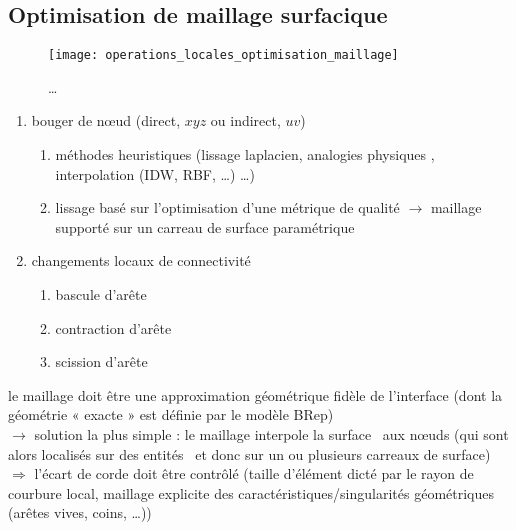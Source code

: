






\subsection{Optimisation de maillage surfacique}
\begin{figure}
\centering
\texttt{[image: operations\_locales\_optimisation\_maillage]}
\caption{\ldots}
\label{fig:operations_locales_optimisation_maillage}
\end{figure}

\begin{enumerate}
	\item bouger de n\oe ud (direct, \ie $xyz$ ou indirect, \ie $uv$)
	\begin{enumerate}
		\item méthodes heuristiques (lissage laplacien, analogies physiques \cite{farhat1998}, interpolation (IDW, RBF, \ldots) \ldots)
		\item lissage basé sur l'optimisation d'une métrique de qualité \cite{freitag1995, canann1998, jiao2008} \cite{gargallo2014} $\to$ maillage supporté sur un carreau de surface paramétrique
	\end{enumerate}
	\item changements locaux de connectivité
	\begin{enumerate}
		\item bascule d'arête
		\item contraction d'arête
		\item scission d'arête
	\end{enumerate}
\end{enumerate}




\par\bigskip
le maillage doit être une approximation géométrique fidèle de l’interface (dont la géométrie
« exacte » est définie par le modèle BRep)\\
$\to$ solution la plus simple : le maillage interpole la surface \brep\ aux n\oe uds (qui sont alors localisés sur des entités \brep\ et donc sur un ou plusieurs carreaux de surface) $\Rightarrow$ l'écart de corde doit être contrôlé (taille d'élément dicté par le rayon de courbure local, maillage explicite des caractéristiques/singularités géométriques (arêtes vives, coins, \ldots))


